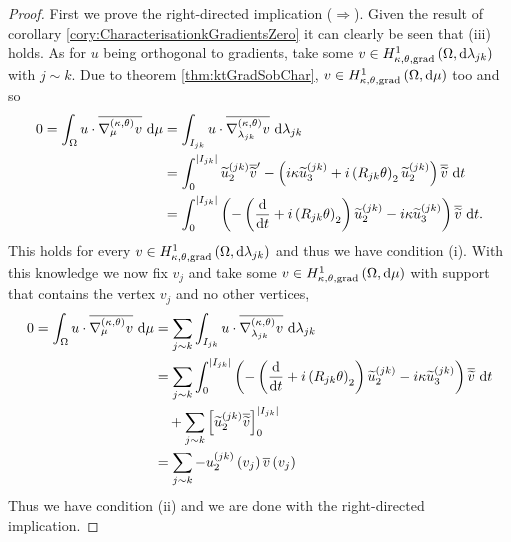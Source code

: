 \begin{proof}
	First we prove the right-directed implication ($\Rightarrow$).
	Given the result of corollary \ref{cory:CharacterisationkGradientsZero} it can clearly be seen that (iii) holds.
	As for $u$ being orthogonal to gradients, take some $v\in H^1_{\kappa,\theta,\mathrm{grad}}\left( \Omega, \mathrm{d}\lambda_{jk} \right)$ with $j\sim k$.
	Due to theorem \ref{thm:ktGradSobChar}, $v\in H^1_{\kappa,\theta,\mathrm{grad}}\left( \Omega, \mathrm{d}\mu \right)$ too and so
	\begin{align*}
		0 = \integral{\ddom}{u\cdot\overline{\ktgrad_\ddmes v}}{\ddmes}
		&= \integral{I_{jk}}{u\cdot\overline{\ktgrad_{\lambda_{jk}} v}}{\lambda_{jk}} \\
		&= \int_0^{\abs{I_{jk}}} \widetilde{u}_2^{(jk)}\overline{\widetilde{v}}' - \bracs{i\wavenumber\widetilde{u}_3^{(jk)} + i\bracs{R_{jk}\qm}_2\widetilde{u}_2^{(jk)}}\overline{\widetilde{v}} \ \md t \\
		&= \int_0^{\abs{I_{jk}}} \bracs{-\bracs{\diff{}{t} + i\bracs{R_{jk}\qm}_2}\widetilde{u}^{(jk)}_2 - i\wavenumber\widetilde{u}^{(jk)}_3}\overline{\widetilde{v}} \ \md t.
	\end{align*}
	This holds for every $v\in H^1_{\kappa,\theta,\mathrm{grad}}\left( \Omega, \mathrm{d}\lambda_{jk} \right)$ and thus we have condition (i).
	With this knowledge we now fix $v_j$ and take some $v\in H^1_{\kappa,\theta,\mathrm{grad}}\left( \Omega, \mathrm{d}\mu \right)$ with support that contains the vertex $v_j$ and no other vertices,
	\begin{align*}
		0 = \int_{\Omega}u\cdot\overline{\nabla^{\left( \kappa, \theta \right)}_\mu v} \ \mathrm{d}\mu
		&= \sum_{j\sim k}\int_{I_{jk}}u\cdot\overline{\nabla^{\left( \kappa, \theta \right)}_{\lambda_{jk}} v} \ \mathrm{d}\lambda_{jk} \\
		&= \sum_{j\sim k}\int_0^{\left\lvert I_{jk} \right\rvert} \left( -\left( \dfrac{\mathrm{d}}{\mathrm{d}t} + i\left( R_{jk}\theta \right)_2 \right)\widetilde{u}^{(jk)}_2 - i\kappa\widetilde{u}^{(jk)}_3 \right)\overline{\widetilde{v}} \ \mathrm{d} t \\
		& \quad + \sum_{j\sim k}\left[ \widetilde{u}_2^{(jk)}\overline{\widetilde{v}} \right]_0^{\left\lvert I_{jk} \right\rvert} \\
		&= \sum_{j\sim k} - u_2^{(jk)}\left( v_j \right)\overline{v}\left( v_j \right) \\
	\end{align*}
	Thus we have condition (ii) and we are done with the right-directed implication. \newline
	

\end{proof}
